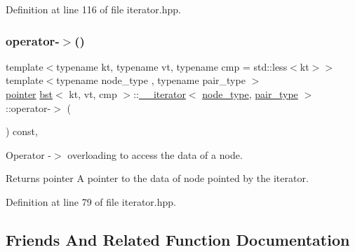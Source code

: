 Definition at line 116 of file iterator.\+hpp.

\mbox{\label{classbst_1_1____iterator_a2a8b7a79b927e8e02b3247188c867e6d}} 
\subsubsection{\texorpdfstring{operator-\/$>$()}{operator->()}}
{\footnotesize\ttfamily template$<$typename kt, typename vt, typename cmp = std\+::less$<$kt$>$$>$ \\
template$<$typename node\+\_\+type , typename pair\+\_\+type $>$ \\
\hyperlink{classbst_1_1____iterator_adb4d1d8f8048f7036ff5ac383ea9c649}{pointer} \hyperlink{classbst}{bst}$<$ kt, vt, cmp $>$\+::\hyperlink{classbst_1_1____iterator}{\+\_\+\+\_\+iterator}$<$ \hyperlink{classbst_a062eb2a1ac54802dbc4f0f74ae2afd01}{node\+\_\+type}, \hyperlink{classbst_a7b11cca2a3b4394915600194f741ab16}{pair\+\_\+type} $>$\+::operator-\/$>$ (\begin{DoxyParamCaption}{ }\end{DoxyParamCaption}) const\hspace{0.3cm}{\ttfamily [inline]}, {\ttfamily [noexcept]}}



Operator -\/$>$ overloading to access the data of a node. 

\begin{DoxyReturn}{Returns}
pointer A pointer to the data of node pointed by the iterator. 
\end{DoxyReturn}


Definition at line 79 of file iterator.\+hpp.



\subsection{Friends And Related Function Documentation}
\mbox{\label{classbst_1_1____iterator_a7aa3d08ff37cace553bd05620c22f924}} 
